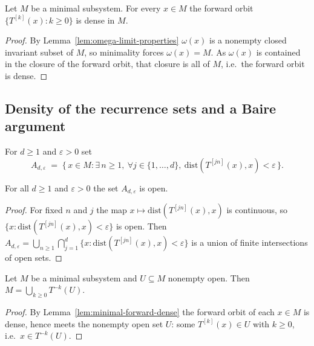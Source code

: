 \begin{lemma}
    \label{lem:minimal-forward-dense}
    \leanok
    Let $M$ be a minimal subsystem. For every $x \in M$ the forward orbit
    $\{T^{[k]}(x) : k \ge 0\}$ is dense in $M$.
\end{lemma}
\begin{proof}
    By Lemma~\ref{lem:omega-limit-properties} $\omega(x)$ is a nonempty closed
    invariant subset of $M$, so minimality forces $\omega(x) = M$. As $\omega(x)$
    is contained in the closure of the forward orbit, that closure is all of $M$,
    i.e.\ the forward orbit is dense.
\end{proof}

\subsection{Density of the recurrence sets and a Baire argument}

For $d \ge 1$ and $\varepsilon > 0$ set
\[
    A_{d,\varepsilon} \;=\; \bigl\{\, x \in M : \exists\, n \ge 1,\ \forall j \in
    \{1, \dots, d\},\ \mathrm{dist}(T^{[j n]}(x), x) < \varepsilon \,\bigr\}.
\]

\begin{lemma}
    \label{lem:Aset-open}
    \leanok
    For all $d \ge 1$ and $\varepsilon > 0$ the set $A_{d,\varepsilon}$ is open.
\end{lemma}
\begin{proof}
    For fixed $n$ and $j$ the map $x \mapsto \mathrm{dist}(T^{[j n]}(x), x)$ is
    continuous, so $\{x : \mathrm{dist}(T^{[j n]}(x), x) < \varepsilon\}$ is open.
    Then
    $A_{d,\varepsilon} = \bigcup_{n \ge 1} \bigcap_{j=1}^{d}
    \{x : \mathrm{dist}(T^{[j n]}(x), x) < \varepsilon\}$
    is a union of finite intersections of open sets.
\end{proof}

\begin{lemma}
    \label{lem:orbit-preimage-cover}
    \leanok
    Let $M$ be a minimal subsystem and $U \subseteq M$ nonempty open. Then
    $M = \bigcup_{k \ge 0} T^{-k}(U)$.
\end{lemma}
\begin{proof}
    By Lemma~\ref{lem:minimal-forward-dense} the forward orbit of each $x \in M$
    is dense, hence meets the nonempty open set $U$: some $T^{[k]}(x) \in U$ with
    $k \ge 0$, i.e.\ $x \in T^{-k}(U)$.
\end{proof}

